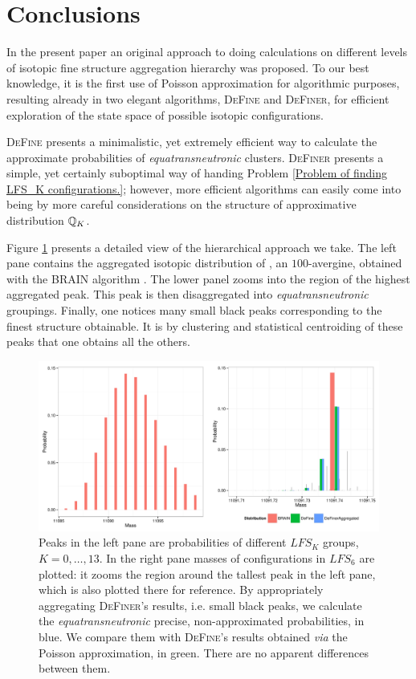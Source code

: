 \section{Conclusions}

	In the present paper an original approach to doing calculations on different levels of isotopic fine structure aggregation hierarchy was proposed. To our best knowledge, it is the first use of Poisson approximation for algorithmic purposes,   resulting already in two elegant algorithms, \textsc{DeFine} and \textsc{DeFiner}, for efficient exploration of the state space of possible isotopic configurations.  

	\textsc{DeFine} presents a minimalistic, yet extremely efficient way to calculate the approximate probabilities of {\it equatransneutronic} clusters. \textsc{DeFiner} presents a simple, yet certainly suboptimal way of handing Problem \ref{Problem of finding LFS_K configurations.}; however, more efficient algorithms can easily come into being by more careful considerations on the structure of approximative distribution $\mathbb{Q}_K$. 

	Figure \ref{figure: hierarchy} presents a detailed view of the hierarchical approach we take. The left pane contains the  aggregated isotopic distribution of \testAvergine, an $100$-avergine, obtained with the {\sc BRAIN} algorithm \cite{Dittwald2013BRAIN}. The lower panel zooms into the region of the highest aggregated peak. This peak is then disaggregated into {\it equatransneutronic} groupings. Finally, one notices many small black peaks corresponding to the finest structure obtainable. It is by clustering and statistical centroiding of these peaks that one obtains all the others. 

\begin{figure}[htbp]
 \centering
 \includegraphics[width=\textwidth]{./img/hierarchyHorizontal}
 \caption{ Peaks in the left pane are probabilities of different $LFS_K$ groups, $K = 0,\dots,13$. In the right pane masses of configurations in $LFS_6$ are plotted: it zooms the region around the tallest peak in the left pane, which is also plotted there for reference. By appropriately aggregating \textsc{DeFiner}'s results, i.e. small black peaks, we calculate the {\it equatransneutronic} precise, non-approximated probabilities, in blue. We compare them with \textsc{DeFine}'s results obtained {\it via} the Poisson approximation, in green. There are no apparent differences between them. }
 \label{figure: hierarchy}
\end{figure}


